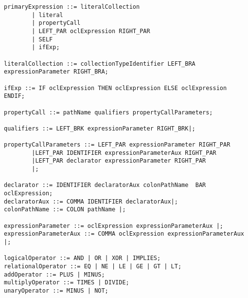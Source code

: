 \begin{lstlisting}[frame=single, caption={AnaliseSintatica.cup}]
primaryExpression ::= literalCollection
		| literal
		| propertyCall
		| LEFT_PAR oclExpression RIGHT_PAR
		| SELF
		| ifExp;

literalCollection ::= collectionTypeIdentifier LEFT_BRA expressionParameter RIGHT_BRA;
 
ifExp ::= IF oclExpression THEN oclExpression ELSE oclExpression ENDIF;

propertyCall ::= pathName qualifiers propertyCallParameters;

qualifiers ::= LEFT_BRK expressionParameter RIGHT_BRK|;

propertyCallParameters ::= LEFT_PAR expressionParameter RIGHT_PAR
		|LEFT_PAR IDENTIFIER expressionParameterAux RIGHT_PAR
		|LEFT_PAR declarator expressionParameter RIGHT_PAR
		|;
						   
declarator ::= IDENTIFIER declaratorAux colonPathName  BAR oclExpression;
declaratorAux ::= COMMA IDENTIFIER declaratorAux|;
colonPathName ::= COLON pathName |;

expressionParameter ::= oclExpression expressionParameterAux |;
expressionParameterAux ::= COMMA oclExpression expressionParameterAux |;

logicalOperator ::= AND | OR | XOR | IMPLIES;
relationalOperator ::= EQ | NE | LE | GE | GT | LT;
addOperator ::= PLUS | MINUS;
multiplyOperator ::= TIMES | DIVIDE;
unaryOperator ::= MINUS | NOT;
\end{lstlisting}
\normalsize